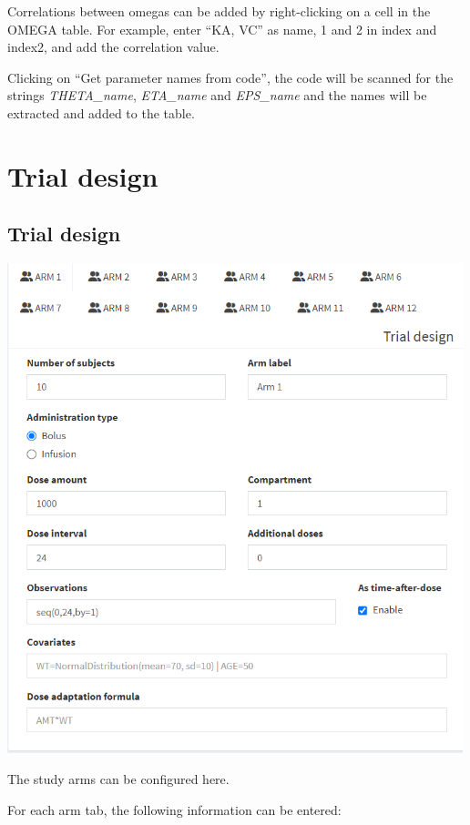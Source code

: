 \documentclass[
]{book}
\begin{document}
Correlations between omegas can be added by right-clicking on a cell in the OMEGA table. For example, enter ``KA, VC'' as name, 1 and 2 in index and index2, and add the correlation value.

Clicking on ``Get parameter names from code'', the code will be scanned for the strings \emph{THETA\_name}, \emph{ETA\_name} and \emph{EPS\_name} and the names will be extracted and added to the table.

\chapter{Trial design}\label{trial-design}

\section{Trial design}\label{trial-design-1}

\includegraphics[width=5.20833in,height=\textheight]{pictures/trial_design.png}

The study arms can be configured here.

For each arm tab, the following information can be entered:
\end{document}
